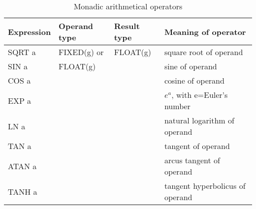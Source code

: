 \begin{table} %
\begin{center}
\caption{Monadic arithmetical operators}
\label{tab_monadic_aritmetic}
\vspace{5mm}
\begin{tabular}{|l|l|l|l|}
\hline 
{\bf Expression} & {\bf Operand type} & {\bf Result type} & {\bf Meaning of operator}\\ \hline
SQRT a           & FIXED(g) or        & FLOAT(g)          & square root of operand \\ \cline{1-1} \cline{4-4}
SIN a            & FLOAT(g)           &                   & sine of operand \\ \cline{1-1} \cline{4-4}
COS a            &                    &                   & cosine of operand \\ \cline{1-1} \cline{4-4}
EXP a            &                    &                   & $e^{a}$, with e=Euler's number\\ \cline{1-1} \cline{4-4}
LN a             &                    &                   & natural logarithm of operand\\ \cline{1-1} \cline{4-4}
TAN a            &                    &                   & tangent of operand \\ \cline{1-1} \cline{4-4}
ATAN a           &                    &                   & arcus tangent of operand\\ \cline{1-1} \cline{4-4}
TANH a           &                    &                   & tangent hyperbolicus of operand\\
\hline
\end{tabular}
\end{center}
\end{table}

